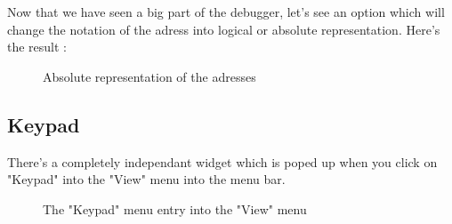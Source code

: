 \documentclass[10pt]{report}
\begin{document}
Now that we have seen a big part of the debugger, let's see an option which will change the notation of the adress into logical or absolute representation.\newline
Here's the result :\newline
\begin{figure}[H]
\centering
{}
\caption{Absolute representation of the adresses}
\end{figure}

\subsection{Keypad}

There's a completely independant widget which is poped up when you click on "Keypad" into the "View" menu into the menu bar.\newline

\begin{figure}[H]
\centering
{}
\caption{The "Keypad" menu entry into the "View" menu}
\end{figure}
\end{document}
